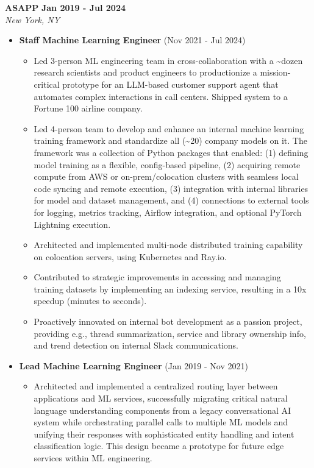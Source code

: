 \documentclass[10pt,letterpaper]{article}
\newcommand{\experienceentry}[5]{
  \noindent\textbf{#1} \hfill \textbf{#2}\\
  \textit{#3} \hfill \textit{#4}\\[-8pt]
  #5
}
\begin{document}
\experienceentry{ASAPP}{Jan 2019 - Jul 2024}{New York, NY}{}{
\begin{itemize}[leftmargin=*, nosep]
  \item \textbf{Staff Machine Learning Engineer} (Nov 2021 - Jul 2024)
  \begin{itemize}[leftmargin=*, nosep]
    \item Led 3-person ML engineering team in cross-collaboration with a \~{}dozen research scientists and product engineers to productionize a mission-critical prototype for an LLM-based customer support agent that automates complex interactions in call centers. Shipped system to a Fortune 100 airline company.
    \item Led 4-person team to develop and enhance an internal machine learning training framework and standardize all (\~{}20) company models on it. The framework was a collection of Python packages that enabled: (1) defining model training as a flexible, config-based pipeline, (2) acquiring remote compute from AWS or on-prem/colocation clusters with seamless local code syncing and remote execution, (3) integration with internal libraries for model and dataset management, and (4) connections to external tools for logging, metrics tracking, Airflow integration, and optional PyTorch Lightning execution.
    \item Architected and implemented multi-node distributed training capability on colocation servers, using Kubernetes and Ray.io.
    \item Contributed to strategic improvements in accessing and managing training datasets by implementing an indexing service, resulting in a 10x speedup (minutes to seconds).
    \item Proactively innovated on internal bot development as a passion project, providing e.g., thread summarization, service and library ownership info, and trend detection on internal Slack communications.
  \end{itemize}
  \item \textbf{Lead Machine Learning Engineer} (Jan 2019 - Nov 2021)
  \begin{itemize}[leftmargin=*, nosep]
    \item Architected and implemented a centralized routing layer between applications and ML services, successfully migrating critical natural language understanding components from a legacy conversational AI system while orchestrating parallel calls to multiple ML models and unifying their responses with sophisticated entity handling and intent classification logic. This design became a prototype for future edge services within ML engineering.

\end{itemize}
\end{itemize}}
\end{document}
